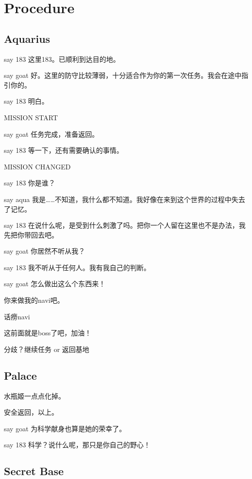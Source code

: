 \documentclass{article}
\begin{document}
\section{Procedure}



\subsection{Aquarius}

say 183 这里183。已顺利到达目的地。

say goat 好。这里的防守比较薄弱，十分适合作为你的第一次任务。我会在途中指引你的。

say 183 明白。

MISSION START

say goat 任务完成，准备返回。

say 183 等一下，还有需要确认的事情。

MISSION CHANGED

say 183 你是谁？

say aqua 我是……不知道，我什么都不知道。我好像在来到这个世界的过程中失去了记忆。

say 183 在说什么呢，是受到什么刺激了吗。把你一个人留在这里也不是办法，我先把你带回去吧。

say goat 你居然不听从我？

say 183 我不听从于任何人。我有我自己的判断。

say goat 怎么做出这么个东西来！

你来做我的navi吧。

话痨navi

这前面就是boss了吧，加油！

分歧？继续任务 or 返回基地



\subsection{Palace}

水瓶姬一点点化掉。

安全返回，以上。


say goat 为科学献身也算是她的荣幸了。

say 183 科学？说什么呢，那只是你自己的野心！

\subsection{Secret Base}
\end{document}
